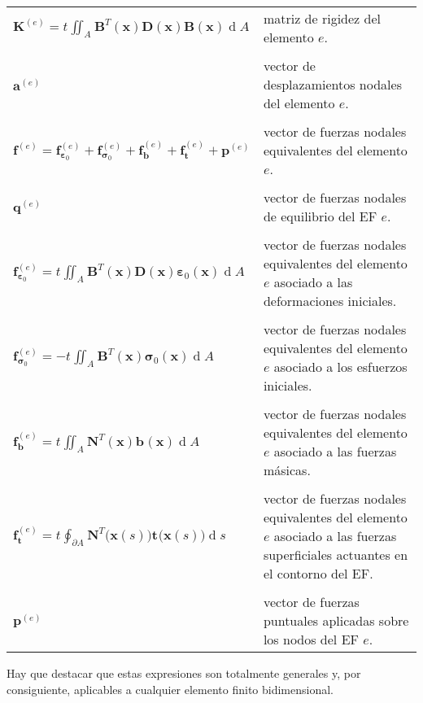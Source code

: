 \documentclass[12pt,letterpaper, landscape]{article}
\newcommand{\e}{{}}
\newcommand{\ve}[1]{{\boldsymbol{#1}}}
\newcommand{\ma}[1]{{\boldsymbol{#1}}}
\newcommand{\dd}{\operatorname{d} \!}
\begin{document}
\begin{tabular}{lp{14.2cm}}
   $\displaystyle \ma{K}^{(e)} = t^\e \iint_{A^\e}  \ma{B}^T(\ve{x})\ma{D}(\ve{x})\ma{B}(\ve{x}) \dd A$ & matriz de rigidez del elemento $e$.\\
   \\[-1ex]
   $\ve{a}^{(e)}$ & vector de desplazamientos nodales del elemento $e$.\\
   \\[-1ex]
   $\ma{f}^{(e)} = \ve{f}_{\ve{\varepsilon}_0}^{(e)} + \ve{f}_{\ve{\sigma}_0}^{(e)} + \ve{f}^{(e)}_\ve{b} + \ve{f}^{(e)}_\ve{t} + \ve{p}^{(e)}$     &  vector de fuerzas nodales equivalentes del elemento $e$.\\
   \\[-1ex]
   $\ve{q}^{(e)}$ & vector de fuerzas nodales de equilibrio del EF $e$.\\   
   \\[-1ex]
   $\displaystyle\ve{f}^{(e)}_{\ve{\varepsilon}_0} = t^\e \iint_{A^\e}  \ma{B}^T(\ve{x})\ma{D}(\ve{x})\ve{\varepsilon}_0(\ve{x}) \dd A$      & vector de fuerzas nodales equivalentes del elemento $e$ asociado a las deformaciones iniciales.\\
   \\[-1ex]   
   $\displaystyle \ve{f}^{(e)}_{\ve{\sigma}_0} = -t^\e \iint_{A^\e}  \ma{B}^T(\ve{x})\ve{\sigma}_0(\ve{x}) \dd A$ &vector de fuerzas nodales equivalentes del elemento $e$ asociado a los esfuerzos iniciales.\\
   \\[-1ex]
   $\displaystyle \ve{f}^{(e)}_\ve{b} = t^\e \iint_{A^\e}  \ma{N}^T(\ve{x}) \ve{b}^\e(\ve{x}) \dd A$ &vector de fuerzas nodales equivalentes del elemento $e$ asociado a las fuerzas másicas.\\
   \\[-1ex]
   $\displaystyle \ve{f}^{(e)}_\ve{t} = t^\e \oint_{\partial A^\e} \ma{N}^T\big(\ve{x}(s)\big) \ve{t}^\e\big(\ve{x}(s)\big) \dd s$ &vector de fuerzas nodales equivalentes del elemento $e$ asociado a las fuerzas superficiales actuantes en el contorno del EF.\\
\\[-1ex]   
   $\ve{p}^{(e)}$       & vector de fuerzas puntuales aplicadas sobre los nodos del EF $e$.
\end{tabular} 

\vspace{\baselineskip}\vspace{\baselineskip}
Hay que destacar que estas expresiones son totalmente generales y, por consiguiente, aplicables a cualquier elemento finito bidimensional.
\end{document}
